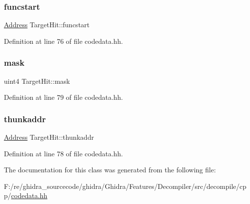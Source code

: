 \subsubsection{\texorpdfstring{funcstart}{funcstart}}
{\footnotesize\ttfamily \mbox{\hyperlink{class_address}{Address}} Target\+Hit\+::funcstart}



Definition at line 76 of file codedata.\+hh.

\mbox{\label{class_target_hit_a87194e6e0f08f54b886b573137067428}} 
\subsubsection{\texorpdfstring{mask}{mask}}
{\footnotesize\ttfamily uint4 Target\+Hit\+::mask}



Definition at line 79 of file codedata.\+hh.

\mbox{\label{class_target_hit_a3e0aa2b35bbf3a559dde22a8c214a67e}} 
\subsubsection{\texorpdfstring{thunkaddr}{thunkaddr}}
{\footnotesize\ttfamily \mbox{\hyperlink{class_address}{Address}} Target\+Hit\+::thunkaddr}



Definition at line 78 of file codedata.\+hh.



The documentation for this class was generated from the following file\+:\begin{DoxyCompactItemize}
\item 
F\+:/re/ghidra\+\_\+sourcecode/ghidra/\+Ghidra/\+Features/\+Decompiler/src/decompile/cpp/\mbox{\hyperlink{codedata_8hh}{codedata.\+hh}}\end{DoxyCompactItemize}
